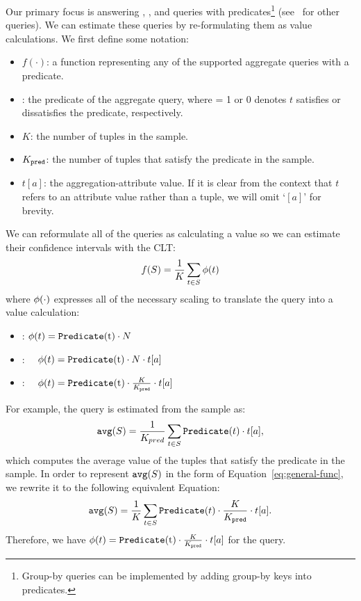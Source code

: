 Our primary focus is answering \avgfunc, \countfunc, and \sumfunc queries with predicates\footnote{\scriptsize Group-by queries can be implemented by adding group-by keys into predicates.} (see~\cite{saqpfull} for other queries).
We can estimate these queries by re-formulating them as \mean value calculations.
We first define some notation:
\begin{itemize}\vspace{-.5em}
\item $f(\cdot)$: a function representing any of the supported aggregate queries with a predicate.
\item {}: the predicate of the aggregate query, where  = 1 or 0 denotes $t$ satisfies or dissatisfies the predicate, respectively.
\item $K$: the number of tuples in the sample.
\item $K_{\texttt{pred} }$: the number of tuples that satisfy the predicate in the sample.
\item $t[a]$: the aggregation-attribute value. If it is clear from the context that $t$ refers to an attribute value rather than a tuple, we will omit `$[a]$' for brevity.

\end{itemize}
We can reformulate all of the queries as calculating a \mean value so we can estimate their confidence intervals with the CLT:
\begin{equation}\label{eq:general-func}\small
f(S) = \frac{1}{K} \sum_{t \in S} \saqpfunc(t)
\end{equation}
where $\phi (\cdot)$ expresses all of the necessary scaling to translate the query into a \mean value calculation:
\begin{itemize}\vspace{-.5em}
\item \countfunc: $\saqpfunc(t) = \Predicate{t} \cdot N$\vspace{-.5em}
\item \sumfunc: ~\, $\saqpfunc(t) = \Predicate{t} \cdot N \cdot t[a]$\vspace{-.5em}
\item \avgfunc: ~\, $\saqpfunc(t) = \Predicate{t} \cdot \frac{K}{K_{\pred}}  \cdot t[a] $ 
\end{itemize}
For example, the \avgfunc query is estimated from the sample as:
\begin{equation}
\texttt{avg} (S) = \frac{1}{K_{pred}}  \sum_{t \in S} \texttt{Predicate}(t) \cdot t[a],
\end{equation}
which computes the average value of the tuples that satisfy the predicate in the sample. In order to represent $\texttt{avg} (S)$ in the form of Equation~\ref{eq:general-func}, we rewrite it to the following equivalent Equation:  
\begin{equation}
\texttt{avg} (S) = \frac{1}{K}  \sum_{t \in S} \texttt{Predicate}(t) \cdot \frac{K}{K_{\texttt{pred} }}  \cdot t[a].
\end{equation}
Therefore, we have $\saqpfunc(t) = \Predicate{t} \cdot \frac{K}{K_{\pred}}  \cdot t[a] $ for the \avgfunc query.


